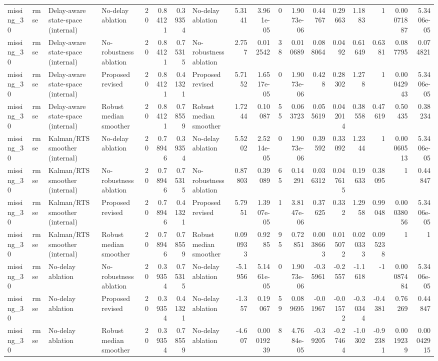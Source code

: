 \begin{table}[!htbp]
{\begin{tabular}{llllrrrlrrrrrrrrrr}
missing_30 & rmse & Delay-aware state-space (internal) & No-delay ablation & 20 & 0.84121 & 0.39354 & No-delay ablation & 5.3141 & 3.961e-05 & 0 & 1.9073e-06 & 0.44767 & 0.29663 & 1.1883 & 1 & 0.00071887 & 5.3406e-05 \\
missing_30 & rmse & Delay-aware state-space (internal) & No-robustness ablation & 20 & 0.84121 & 0.75315 & No-robustness ablation & 2.757 & 0.012542 & 38 & 0.010689 & 0.088064 & 0.0492 & 0.61649 & 0.6381 & 0.087795 & 0.074821 \\
missing_30 & rmse & Delay-aware state-space (internal) & Proposed revised & 20 & 0.84121 & 0.41321 & Proposed revised & 5.7152 & 1.6517e-05 & 0 & 1.9073e-06 & 0.428 & 0.28302 & 1.278 & 1 & 0.00042943 & 5.3406e-05 \\
missing_30 & rmse & Delay-aware state-space (internal) & Robust median smoother & 20 & 0.84121 & 0.78559 & Robust median smoother & 1.7244 & 0.10087 & 55 & 0.063723 & 0.055619 & 0.042014 & 0.38558 & 0.47619 & 0.50435 & 0.38234 \\
missing_30 & rmse & Kalman/RTS smoother (internal) & No-delay ablation & 20 & 0.78946 & 0.39354 & No-delay ablation & 5.5202 & 2.5214e-05 & 0 & 1.9073e-06 & 0.39592 & 0.33092 & 1.2344 & 1 & 0.00060513 & 5.3406e-05 \\
missing_30 & rmse & Kalman/RTS smoother (internal) & No-robustness ablation & 20 & 0.78946 & 0.75315 & No-robustness ablation & 0.87803 & 0.39089 & 65 & 0.14291 & 0.036312 & 0.047615 & 0.19633 & 0.38095 & 1 & 0.44847 \\
missing_30 & rmse & Kalman/RTS smoother (internal) & Proposed revised & 20 & 0.78946 & 0.41321 & Proposed revised & 5.7951 & 1.3907e-05 & 1 & 3.8147e-06 & 0.37625 & 0.332 & 1.2958 & 0.99048 & 0.00038056 & 5.3406e-05 \\
missing_30 & rmse & Kalman/RTS smoother (internal) & Robust median smoother & 20 & 0.78946 & 0.78559 & Robust median smoother & 0.090933 & 0.9285 & 95 & 0.72851 & 0.0038663 & 0.015072 & 0.020333 & 0.095238 & 1 & 1 \\
missing_30 & rmse & No-delay ablation & No-robustness ablation & 20 & 0.39354 & 0.75315 & No-delay ablation & -5.1956 & 5.1461e-05 & 0 & 1.9073e-06 & -0.35961 & -0.2557 & -1.1618 & -1 & 0.00087484 & 5.3406e-05 \\
missing_30 & rmse & No-delay ablation & Proposed revised & 20 & 0.39354 & 0.41321 & No-delay ablation & -1.357 & 0.19067 & 59 & 0.089695 & -0.01967 & -0.01572 & -0.30344 & -0.4381 & 0.76269 & 0.44847 \\
missing_30 & rmse & No-delay ablation & Robust median smoother & 20 & 0.39354 & 0.78559 & No-delay ablation & -4.607 & 0.00019239 & 8 & 4.7684e-05 & -0.39205 & -0.27464 & -1.0302 & -0.92381 & 0.0019239 & 0.00042915 \\

\end{tabular}}
\end{table}

